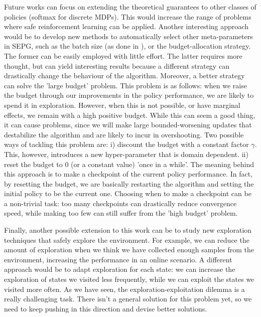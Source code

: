 Future works can focus on extending the theoretical guarantees to other classes of policies (\eg softmax for discrete MDPs). This would increase the range of problems where safe reinforcement learning can be applied. Another interesting approach would be to develop new methods to automatically select other meta-parameters in SEPG, such as the batch size (as done in \cite{adaptive_batch}), or the budget-allocation strategy. The former can be easily employed with little effort. The latter requires more thought, but can yield interesting results because a different strategy can drastically change the behaviour of the algorithm. 
Moreover, a better strategy can solve the 'large budget' problem. This problem is as follows: 
when we raise the budget through our improvements in the policy performance, we are likely to spend it in exploration. However, when this is not possible, or have marginal effects, we remain with a high positive budget. While this can seem a good thing, it can cause problems, since we will make large bounded-worsening updates that destabilize the algorithm and are likely to incur in overshooting.
Two possible ways of tackling this problem are: i) discount the budget with a constant factor $\gamma$. This, however, introduces a new hyper-parameter that is domain dependent. ii) reset the budget to 0 (or a constant value) 'once in a while'. The meaning behind this approach is to make a checkpoint of the current policy performance. In fact, by resetting the budget, we are basically restarting the algorithm and setting the initial policy to be the current one. Choosing when to make a checkpoint can be a non-trivial task: too many checkpoints can drastically reduce convergence speed, while making too few can still suffer from the 'high budget' problem. 


Finally, another possible extension to this work can be to study new exploration techniques that safely explore the environment. For example, we can reduce the amount of exploration when we think we have collected enough samples from the environment, increasing the performance in an online scenario. A different approach would be to adapt exploration for each state: we can increase the exploration of states we visited less frequently, while we can exploit the states we visited more often. As we have seen, the exploration-exploitation dilemma is a really challenging task. There isn't a general solution for this problem yet, so we need to keep pushing in this direction and devise better solutions.
